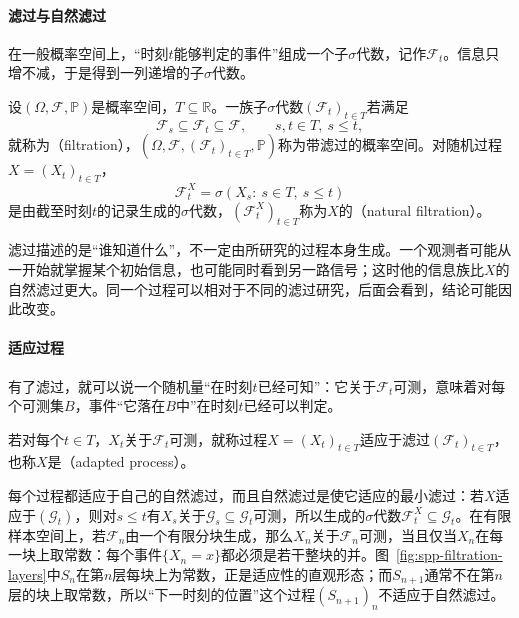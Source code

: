 \paragraph{滤过与自然滤过}
在一般概率空间上，“时刻$t$能够判定的事件”组成一个子$\sigma$代数，记作$\mathcal F_t$。信息只增不减，于是得到一列递增的子$\sigma$代数。

\begin{definition}[滤过与自然滤过]
\label{def:spp-filtration}
设$(\Omega,\mathcal F,\mathbb P)$是概率空间，$T\subseteq\mathbb R$。一族子$\sigma$代数$(\mathcal F_t)_{t\in T}$若满足
\[
  \mathcal F_s\subseteq\mathcal F_t\subseteq\mathcal F,\qquad s,t\in T,\ s\le t,
\]
就称为（filtration），$(\Omega,\mathcal F,(\mathcal F_t)_{t\in T},\mathbb P)$称为带滤过的概率空间。对随机过程$X=(X_t)_{t\in T}$，
\[
  \mathcal F^X_t=\sigma(X_s:\ s\in T,\ s\le t)
\]
是由截至时刻$t$的记录生成的$\sigma$代数，$(\mathcal F^X_t)_{t\in T}$称为$X$的（natural filtration）。
\end{definition}

滤过描述的是“谁知道什么”，不一定由所研究的过程本身生成。一个观测者可能从一开始就掌握某个初始信息，也可能同时看到另一路信号；这时他的信息族比$X$的自然滤过更大。同一个过程可以相对于不同的滤过研究，后面会看到，结论可能因此改变。

\paragraph{适应过程}
有了滤过，就可以说一个随机量“在时刻$t$已经可知”：它关于$\mathcal F_t$可测，意味着对每个可测集$B$，事件“它落在$B$中”在时刻$t$已经可以判定。

\begin{definition}[适应过程]
\label{def:spp-adapted}
若对每个$t\in T$，$X_t$关于$\mathcal F_t$可测，就称过程$X=(X_t)_{t\in T}$适应于滤过$(\mathcal F_t)_{t\in T}$，也称$X$是（adapted process）。
\end{definition}

每个过程都适应于自己的自然滤过，而且自然滤过是使它适应的最小滤过：若$X$适应于$(\mathcal G_t)$，则对$s\le t$有$X_s$关于$\mathcal G_s\subseteq\mathcal G_t$可测，所以生成的$\sigma$代数$\mathcal F^X_t\subseteq\mathcal G_t$。在有限样本空间上，若$\mathcal F_n$由一个有限分块生成，那么$X_n$关于$\mathcal F_n$可测，当且仅当$X_n$在每一块上取常数：每个事件$\{X_n=x\}$都必须是若干整块的并。图~\ref{fig:spp-filtration-layers}中$S_n$在第$n$层每块上为常数，正是适应性的直观形态；而$S_{n+1}$通常不在第$n$层的块上取常数，所以“下一时刻的位置”这个过程$(S_{n+1})_n$不适应于自然滤过。

